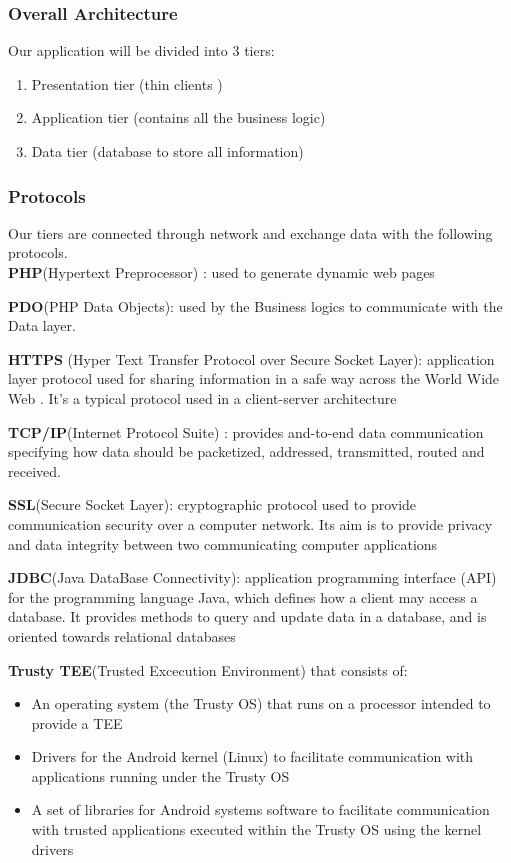 \documentclass{article}
\begin{document}
\begin{flushleft}
\subsubsection{Overall Architecture}
Our application will be divided into 3 tiers:\\
\begin{enumerate}
\item Presentation tier (thin clients )
\item Application tier (contains all the business logic)
\item Data tier (database to store all information)
\end{enumerate}
\subsubsection{Protocols}
Our tiers are connected through network and exchange data with the following protocols.
\vspace{1cm}
\\

\textbf{PHP}(Hypertext Preprocessor) : used to generate dynamic web pages\break\break

\textbf{PDO}(PHP Data Objects): used by the Business logics to communicate with the Data layer. \break\break

\textbf{HTTPS} (Hyper Text Transfer Protocol over Secure Socket Layer): application layer protocol used for sharing information in a safe way across the World Wide Web . It's a typical protocol used in a client-server architecture\break\break

\textbf{TCP/IP}(Internet Protocol Suite) : provides and-to-end data communication specifying how data should be packetized, addressed, transmitted, routed and received.\break\break

\textbf{SSL}(Secure Socket Layer): cryptographic protocol used to provide communication security over a computer network. Its aim is to provide privacy and data integrity between two communicating computer applications\break\break

\textbf{JDBC}(Java DataBase Connectivity): application programming interface (API) for the programming language Java, which defines how a client may access a database. It provides methods to query and update data in a database, and is oriented towards relational databases \break\break

\textbf{Trusty TEE}(Trusted Excecution Environment) that consists of:
\begin{itemize}
\item An operating system (the Trusty OS) that runs on a processor intended to provide a TEE
\item Drivers for the Android kernel (Linux) to facilitate communication with applications running under the Trusty OS
\item A set of libraries for Android systems software to facilitate communication with trusted applications executed within the Trusty OS using the kernel drivers


\end{itemize}
\end{flushleft}
\end{document}
